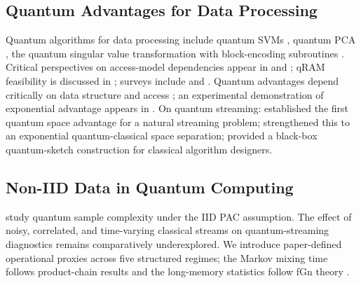 \documentclass[sensors,article,submit,pdftex,moreauthors]{Definitions/mdpi}
\providecommand{\DIFadd}[1]{{\protect\color{blue}#1}} %
\providecommand{\DIFdel}[1]{} %
\providecommand{\DIFaddbegin}{} %
\providecommand{\DIFaddend}{} %
\providecommand{\DIFdelbegin}{} %
\providecommand{\DIFdelend}{} %
\begin{document}
\subsection{Quantum Advantages for Data Processing}

Quantum algorithms for data processing include quantum SVMs \citep{rebentrost2014quantum}, quantum PCA \citep{lloyd2014quantum}, the quantum singular value transformation \citep{gilyen2019qsvt} with block-encoding subroutines \citep{chakraborty2019blockencodings}. Critical perspectives on access-model dependencies appear in \citet{aaronson2015readthefineprint} and \citet{tang2019quantum}; qRAM feasibility is discussed in \citet{giovannetti2008quantum}; surveys include \citet{chen2024qmlsurvey} and \citet{schuld2018supervised}. Quantum advantages depend critically on data structure and access \citep{huang2021powerofdata}; an experimental demonstration of exponential advantage appears in \citet{huang2022experiments}. On quantum streaming: \citet{kallaugher2021streaming} established the first \DIFdelbegin \DIFdel{exponential quantum-classical space separation }\DIFdelend \DIFaddbegin \DIFadd{quantum space advantage }\DIFaddend for a natural streaming problem; \DIFaddbegin \citet{kallaugher2024maxdicut} \DIFadd{strengthened this to an exponential quantum-classical space separation; }\DIFaddend \citet{kallaugher2025designquantum} provided a black-box quantum-sketch construction for classical algorithm designers.
\DIFdelbegin \DIFdel{The quantum oracle sketching framework of }%
\DIFdel{avoids qRAM entirely and supports exponential separations for classification and dimension-reduction tasks.
}\DIFdelend 

\subsection{Non-IID Data in Quantum Computing}

\citet{arunachalam2018optimal} study quantum sample complexity under the IID PAC assumption. The \DIFdelbegin \DIFdel{quantum oracle sketching framework }%
\DIFdel{is, to our knowledge, the first to address }\DIFdelend \DIFaddbegin \DIFadd{effect of }\DIFaddend noisy, correlated, and time-varying classical \DIFdelbegin \DIFdel{data in a quantum streaming setting}\DIFdelend \DIFaddbegin \DIFadd{streams on quantum-streaming diagnostics remains comparatively underexplored}\DIFaddend . We introduce \DIFdelbegin \DIFdel{operational proxies inspired by their correlated-data discussion }\DIFdelend \DIFaddbegin \DIFadd{paper-defined operational proxies }\DIFaddend across five structured regimes; the Markov mixing time follows product-chain results \citep{levin2017mixing} and the long-memory statistics follow fGn theory \citep{mandelbrot1968fbm, beran1994statistics}.
\end{document}
